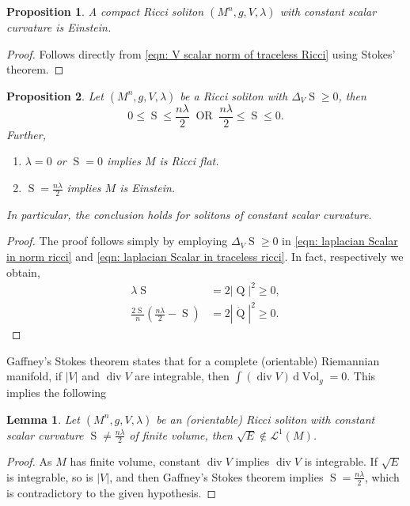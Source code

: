 \documentclass{amsart}
\newcommand{\abs}[1]{\left| #1 \right|}
\newcommand{\derivative}{\mathrm{d}}
\DeclareMathOperator*{\Qricci}{Q}
\DeclareMathOperator*{\scalar}{S}
\DeclareMathOperator*{\divergence}{div}
\DeclareMathOperator*{\Vol}{Vol}
\theoremstyle{plain}
\newtheorem{proposition}{Proposition}
\theoremstyle{plain}
\theoremstyle{plain}
\theoremstyle{plain}
\newtheorem{lemma}{Lemma}
\theoremstyle{remark}
\begin{document}
\begin{proposition}
    A compact Ricci soliton $(M^n,g,V,\lambda)$  with constant scalar curvature is Einstein. 
\end{proposition}
\begin{proof}
    Follows directly from \cref{eqn: V scalar norm of traceless Ricci} using Stokes' theorem.
\end{proof}

\begin{proposition}\label{Cor: bounds on constant scalar curvature}
     Let $(M^n,g,V,\lambda)$ be a Ricci soliton with $\Delta_V \scalar \geq 0$, then
    \begin{equation}
        0 \leq \scalar \leq \frac{n\lambda}{2} ~\text{ OR }~ \frac{n\lambda}{2} \leq \scalar \leq 0.
    \end{equation}
    Further, 
    \begin{enumerate}
        \item $\lambda=0 $ or $\scalar=0$ implies $M$ is Ricci flat.
        \item $\scalar=\frac{n\lambda}{2}$ implies $M$ is Einstein.
    \end{enumerate}
    In particular, the conclusion holds  for solitons of constant scalar curvature.
    \end{proposition}
\begin{proof}
The proof follows  simply  by employing   $\Delta_V \scalar \geq 0$ in
 \cref{eqn: laplacian Scalar in norm ricci} and \cref{eqn: laplacian Scalar in traceless ricci}.        
In fact, respectively we obtain,   
    \begin{align*}
        \lambda\scalar &= 2\abs{\Qricci}^2 \geq 0 , \\
        \frac{2\scalar}{n} \left( \frac{n\lambda}{2} -\scalar \right) &= 2 \abs{\mathring{\Qricci}}^2 \geq 0.
    \end{align*}
\end{proof}






Gaffney's Stokes theorem states that for a complete (orientable) Riemannian manifold, if $\abs{V} $ and $\divergence V$ are integrable, then $\int (\divergence V) \, \derivative \Vol_g =0$. This implies the following 
\begin{lemma}\label{prop: orientable RS constant scalar finite volume mod V notin L1}
    Let $(M^n,g,V,\lambda)$ be an (orientable) Ricci soliton with constant scalar curvature $\scalar \neq \frac{n\lambda}{2}$ of finite volume, then $\sqrt{E}\not\in \mathcal{L}^1 (M) $.
\end{lemma}
\begin{proof}
As  $M$ has finite volume, constant $\divergence V$ implies $\divergence V$ is integrable. 
If $\sqrt{E}$ is integrable, so is $\abs{V}$, and then Gaffney's Stokes theorem implies $\scalar =  \frac{n\lambda}{2}$, which is contradictory to the given hypothesis.
\end{proof} 
\end{document}
